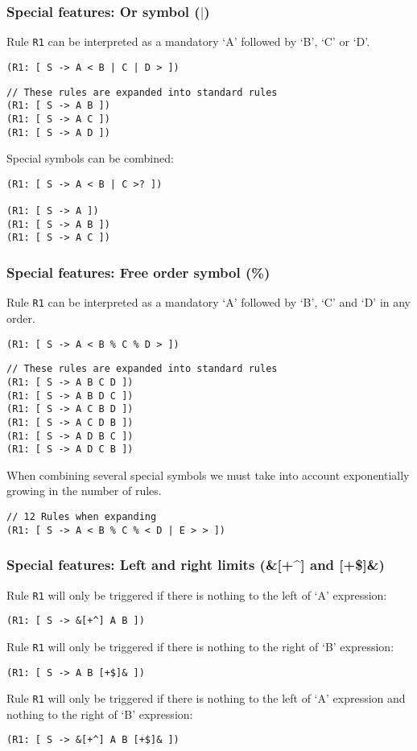 \documentclass[11pt]{beamer}
\begin{document}
\begin{frame}[fragile]
\frametitle{Special features: Or symbol ($|$)}
\small
Rule \texttt{R1} can be interpreted as a mandatory `A' followed by `B', `C' or `D'.
\begin{lstlisting}[language=lekta]
(R1: [ S -> A < B | C | D > ])
\end{lstlisting}
\pause
\begin{lstlisting}[language=lekta]
// These rules are expanded into standard rules
(R1: [ S -> A B ])
(R1: [ S -> A C ])
(R1: [ S -> A D ])
\end{lstlisting}
\vspace{15pt}
\pause
Special symbols can be combined:
\begin{lstlisting}[language=lekta]
(R1: [ S -> A < B | C >? ])

(R1: [ S -> A ])
(R1: [ S -> A B ])
(R1: [ S -> A C ])
\end{lstlisting}
\end{frame}

\begin{frame}[fragile]
\frametitle{Special features: Free order symbol (\%)}
\small
Rule \texttt{R1} can be interpreted as a mandatory `A' followed by `B', `C' and `D' in any order.
\begin{lstlisting}[language=lekta]
(R1: [ S -> A < B % C % D > ])
\end{lstlisting}
\pause
\begin{lstlisting}[language=lekta]
// These rules are expanded into standard rules
(R1: [ S -> A B C D ])
(R1: [ S -> A B D C ])
(R1: [ S -> A C B D ])
(R1: [ S -> A C D B ])
(R1: [ S -> A D B C ])
(R1: [ S -> A D C B ])
\end{lstlisting}
\vspace{10pt}
\pause
When combining several special symbols we must take into account exponentially growing in the number of rules.
\begin{lstlisting}[language=lekta]
// 12 Rules when expanding
(R1: [ S -> A < B % C % < D | E > > ])
\end{lstlisting}
\end{frame}

\begin{frame}[fragile]
\frametitle{Special features: Left and right limits (\&[+\^{}] and [+\$]\&)}
\small
Rule \texttt{R1} will only be triggered if there is nothing to the left of `A' expression:
\begin{lstlisting}[language=lekta]
(R1: [ S -> &[+^] A B ])
\end{lstlisting}
\pause
\vspace{15pt}
Rule \texttt{R1} will only be triggered if there is nothing to the right of `B' expression:
\begin{lstlisting}[language=lekta]
(R1: [ S -> A B [+$]& ])
\end{lstlisting}
\pause
\vspace{15pt}
Rule \texttt{R1} will only be triggered if there is nothing to the left of `A' expression and nothing to the right of `B' expression:
\begin{lstlisting}[language=lekta]
(R1: [ S -> &[+^] A B [+$]& ])
\end{lstlisting}
\end{frame}
\end{document}
